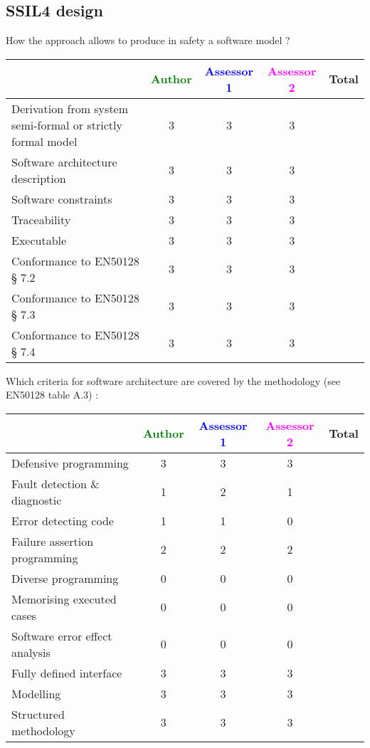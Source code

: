 \subsection{SSIL4 design}

How the approach allows to  produce in safety a software model ?

\begin{tabular}{|l | c | c | c | c|}
\hline
& \textcolor{green}{Author} & \textcolor{blue}{Assessor 1} & \textcolor{magenta}{Assessor 2} & Total \\
\hline
Derivation from system semi-formal or strictly formal model  & 3 & 3 & 3 &  \\
\hline 
Software architecture description  & 3 & 3 & 3 &  \\
\hline
Software constraints  & 3 & 3 & 3 &  \\
\hline
Traceability  & 3 & 3 & 3 &  \\
\hline
Executable  & 3 & 3 & 3 &  \\
\hline
Conformance to EN50128 § 7.2  & 3 & 3 & 3 &  \\
\hline
Conformance to EN50128 § 7.3  & 3 & 3 & 3 &  \\
\hline
Conformance to EN50128 § 7.4  & 3 & 3 & 3 &  \\
\hline
\end{tabular}

Which criteria for software architecture are covered by the methodology
(see EN50128 table A.3) :

\begin{tabular}{|l | c | c | c | c|}
\hline
& \textcolor{green}{Author} & \textcolor{blue}{Assessor 1} & \textcolor{magenta}{Assessor 2} & Total \\
\hline
Defensive programming  & 3 & 3 & 3 &  \\
\hline 
Fault detection \& diagnostic  & 1 & 2 & 1 &  \\
\hline
Error detecting code  & 1 & 1 & 0 &  \\
\hline
Failure assertion programming & 2  & 2 & 2 &  \\
\hline
Diverse programming & 0 & 0 & 0 &  \\
\hline
Memorising executed cases & 0 & 0 & 0 &  \\
\hline
Software error effect analysis & 0 & 0 & 0 &  \\
\hline
Fully defined interface & 3 & 3 & 3 &  \\
\hline
Modelling  & 3 & 3 & 3 &  \\
\hline
Structured methodology & 3 & 3  & 3 & \\
\hline
\end{tabular}

